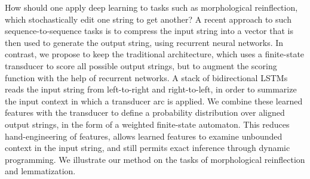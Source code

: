 How should one apply deep learning to tasks such as morphological reinflection, which stochastically edit one string to get another?                          A recent approach to such sequence-to-sequence tasks is to compress the input string into a vector that is then used to generate the output string, using recurrent neural networks. In contrast, we propose to keep the traditional architecture, which uses a finite-state transducer to score all possible output strings, but to augment the scoring function  with the help of recurrent networks.  A stack of bidirectional LSTMs reads the input string from left-to-right and right-to-left, in order to summarize the input context in which a transducer arc is applied. We combine these learned features with the transducer to define a probability distribution over aligned output strings, in the form of a weighted finite-state automaton. This reduces hand-engineering of features, allows learned features to examine unbounded context in the input string, and still permits exact inference through dynamic programming. We illustrate our method on the tasks of morphological reinflection and lemmatization.
